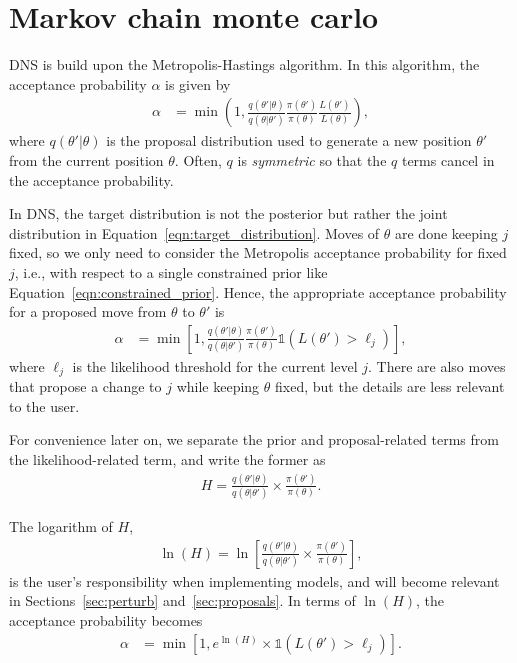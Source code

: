 \documentclass[article]{jss}
\newcommand{\params}{\theta}
\begin{document}
\section{Markov chain monte carlo}\label{sec:mcmc}
DNS is build upon the Metropolis-Hastings algorithm.
In this algorithm, the acceptance probability $\alpha$
is given by
\begin{align*}
\alpha &= \min\left(1,
\frac{q(\params'|\params)}{q(\params | \params')}
\frac{\pi(\params')}{\pi(\params)}\frac{L(\params')}{L(\params)}
\right),
\end{align*}
where $q(\theta' | \theta)$ is the proposal distribution used to generate
a new position $\theta'$ from the current position $\theta$. Often,
$q$ is {\em symmetric} so that the $q$ terms cancel in the acceptance probability.

In DNS, the target distribution is not the posterior but rather
the joint distribution in Equation~\ref{eqn:target_distribution}.
Moves of $\theta$ are done keeping $j$ fixed, so we only need
to consider the Metropolis acceptance probability for fixed $j$,
i.e., with respect to a single constrained prior like
Equation~\ref{eqn:constrained_prior}.
Hence, the appropriate acceptance probability
for a proposed move from $\theta$ to $\theta'$ is
\begin{align}
\alpha &= \min\left[1,
\frac{q(\params'|\params)}{q(\params | \params')}
\frac{\pi(\params')}{\pi(\params)}
\mathds{1}\left(L(\params') > \ell_j\right)
\right],
\label{eqn:log_hastings}
\end{align}
where $\ell_j$ is the likelihood threshold for the current level $j$.
There are also moves that propose a change to $j$ while keeping
$\params$ fixed, but the details are less relevant to the user.

For convenience later on, we 
separate the prior and proposal-related terms from
the likelihood-related term, and write the former as
\begin{align*}
H = \frac{q(\params'|\params)}{q(\params | \params')}
\times \frac{\pi(\params')}{\pi(\params)}.
\end{align*}

The logarithm of $H$,
\begin{align*}
\ln(H) = \ln\left[\frac{q(\params'|\params)}{q(\params | \params')}
\times \frac{\pi(\params')}{\pi(\params)}\right],
\end{align*}
is the user's responsibility when implementing models,
and will become relevant in Sections~\ref{sec:perturb}
and~\ref{sec:proposals}.
In terms of $\ln(H)$, the
acceptance probability becomes
\begin{align}
\alpha &= \min\left[1,
e^{\ln(H)}\times
\mathds{1}\left(L(\params') > \ell_j\right)
\right].\label{eqn:logH}
\end{align}
\end{document}

